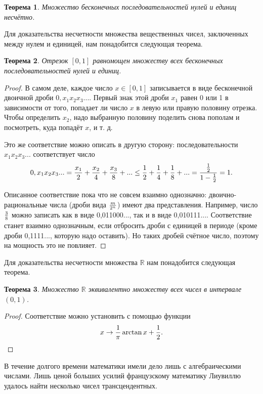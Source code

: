 \documentclass{article}
\newtheorem{theorem}{Теорема}[section]
\begin{document}
\begin{theorem}
Множество бесконечных последовательностей нулей и единиц несчётно.
\end{theorem}

Для доказательства несчетности множества вещественных чисел, заключенных между нулем и единицей, нам понадобится следующая теорема.

\begin{theorem}
Отрезок \([0, 1]\) равномощен множеству всех бесконечных последовательностей нулей и единиц.
\end{theorem}

\begin{proof}
В самом деле, каждое число \(x \in [0, 1]\) записывается в виде бесконечной двоичной дроби \(0,x_1x_2x_3...\). Первый знак этой дроби \(x_1\) равен 0 или 1 в зависимости от того, попадает ли число \(x\) в левую или правую половину отрезка. Чтобы определить \(x_2\), надо выбранную половину поделить снова пополам и посмотреть, куда попадёт \(x\), и т. д.

Это же соответствие можно описать в другую сторону: последовательности \(x_1x_2x_3...\) соответствует число
\[
0,x_1x_2x_3... = {x_1 \over 2} + {x_2 \over 4} + {x_3 \over 8} + ... \leq {1 \over 2} + {1 \over 4} + {1 \over 8} + ... = {{1 \over 2} \over {1 - {1 \over 2}}} = 1.
\]

Описанное соответствие пока что не совсем взаимно однозначно: двоично-рациональные числа (дроби вида \(m \over 2^n\)) имеют два представления. Например, число \(3 \over 8\) можно записать как в виде 0,011000..., так и в виде 0,010111.... Соответствие станет взаимно однозначным, если отбросить дроби с единицей в периоде (кроме дроби 0,1111..., которую надо оставить). Но таких дробей счётное число, поэтому на мощность это не повлияет.
\end{proof}

Для доказательства несчетности множества \(\mathbb{R}\) нам понадобится следующая теорема.

\begin{theorem}
Множество \(\mathbb{R}\) эквивалентно множеству всех чисел в интервале \((0, 1)\).
\end{theorem}

\begin{proof}
Соответствие можно установить с помощью функции
\[
x \to {1 \over \pi}\arctan{x} + {1 \over 2}.
\]
\end{proof}

В течение долгого времени математики имели дело лишь с алгебраическими числами. Лишь ценой больших усилий французскому математику Лиувиллю удалось найти несколько чисел трансцендентных.
\end{document}
